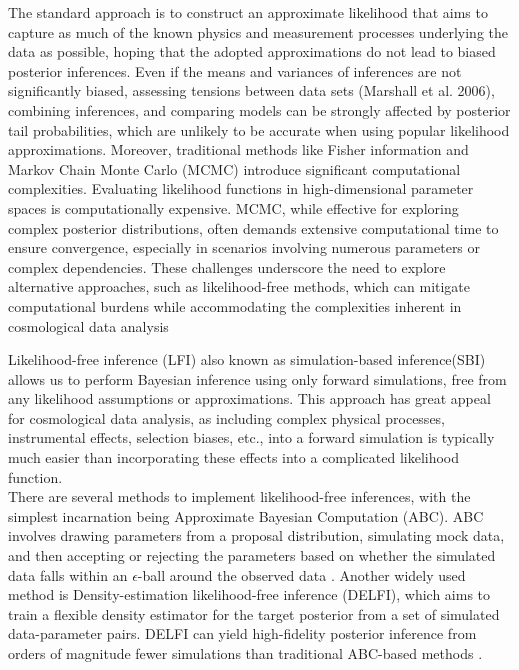 The standard approach is to construct an approximate likelihood that aims to capture as much of the known physics and measurement processes underlying the data as possible, hoping that the adopted approximations do not lead to biased posterior inferences. Even if the means and variances of inferences are not significantly biased, assessing tensions between data sets (Marshall et al. 2006), combining inferences, and comparing models can be strongly affected by posterior tail probabilities\cite{krywonos2024cosmologicalmeasurementscmbbao}, which are unlikely to be accurate when using popular likelihood approximations. Moreover, traditional methods like Fisher information and Markov Chain Monte Carlo (MCMC) \cite{verde2008practicalguidebasicstatistical} introduce significant computational complexities. Evaluating likelihood functions in high-dimensional parameter spaces is computationally expensive. MCMC, while effective for exploring complex posterior distributions, often demands extensive computational time to ensure convergence, especially in scenarios involving numerous parameters or complex dependencies\cite{Akeret_2013}. These challenges underscore the need to explore alternative approaches, such as likelihood-free methods, which can mitigate computational burdens while accommodating the complexities inherent in cosmological data analysis 

Likelihood-free inference (LFI) also known as simulation-based inference(SBI) allows us to perform Bayesian inference using only forward simulations, free from any likelihood assumptions or approximations. This approach has great appeal for cosmological data analysis, as including complex physical processes, instrumental effects, selection biases, etc., into a forward simulation is typically much easier than incorporating these effects into a complicated likelihood function.\\

There are several methods to implement likelihood-free inferences, with the simplest incarnation being Approximate Bayesian Computation (ABC). ABC involves drawing parameters from a proposal distribution, simulating mock data, and then accepting or rejecting the parameters based on whether the simulated data falls within an $\epsilon$-ball around the observed data \cite{Alsing_2019, Alsing_2018}. Another widely used method is Density-estimation likelihood-free inference (DELFI), which aims to train a flexible density estimator for the target posterior from a set of simulated data-parameter pairs. DELFI can yield high-fidelity posterior inference from orders of magnitude fewer simulations than traditional ABC-based methods \cite{Papamakarios:2019ccu, Alsing_2018, Alsing_2019, lueckmann2019likelihoodfreeinferenceemulatornetworks}.\\ 

